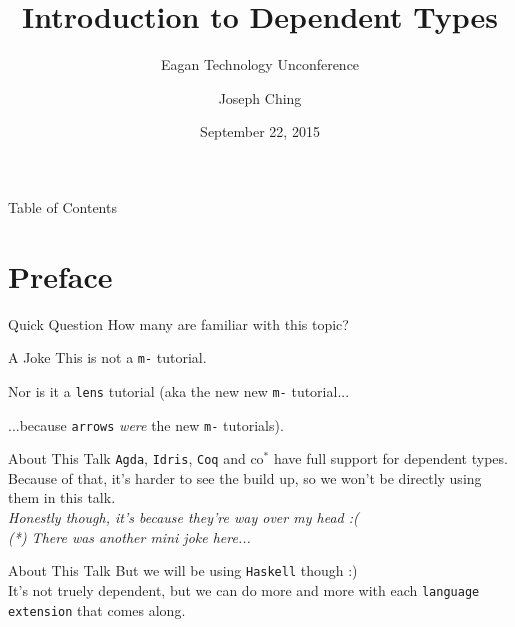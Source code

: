 \documentclass[xcolor={usenames,dvipsnames}]{beamer}
\title{Introduction to Dependent Types}
\subtitle{Eagan Technology Unconference}
\author{Joseph Ching}
\date{September 22, 2015}
\begin{document}
\begin{frame}[plain]
  \titlepage
\end{frame}


\begin{frame}{Table of Contents}
  \tableofcontents[pausesections]
\end{frame}


\section{Preface}

\begin{frame}{Quick Question}
  How many are familiar with this topic?
\end{frame}

\begin{frame}{A Joke}
  This is not a \texttt{m-} tutorial.

  \pause

  Nor is it a \texttt{lens} tutorial
  \pause
  (aka the new new \texttt{m-} tutorial...

  \pause
  ...because \texttt{arrows} \textit{were} the new \texttt{m-} tutorials).

\end{frame}


\begin{frame}{About This Talk}
    \texttt{Agda}, \texttt{Idris}, \texttt{Coq} and co$^*$ have full support for dependent types.\\
    \pause
    Because of that, it's harder to see the build up, so we won't be directly using them in this talk.\\
    \pause
    \textit{\tiny{Honestly though, it's because they're way over my head :(}}\\
    \textit{\tiny{(*) There was another mini joke here...}}
\end{frame}

\begin{frame}{About This Talk}
  But we will be using \texttt{Haskell} though :)\\
  \pause
  It's not truely dependent, but we can do more and more with each \texttt{language extension} that comes along.\\
\end{frame}
\end{document}
